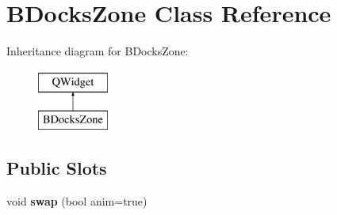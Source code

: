 \hypertarget{class_b_docks_zone}{}\section{B\+Docks\+Zone Class Reference}
\label{class_b_docks_zone}
Inheritance diagram for B\+Docks\+Zone\+:\begin{figure}[H]
\begin{center}
\leavevmode
\includegraphics[height=2.000000cm]{class_b_docks_zone}
\end{center}
\end{figure}
\subsection*{Public Slots}
\begin{DoxyCompactItemize}
\item 
\hypertarget{class_b_docks_zone_a41a7757fb2b8b4cc5c27f9d5a0e3a841}{}\label{class_b_docks_zone_a41a7757fb2b8b4cc5c27f9d5a0e3a841} 
void {\bfseries swap} (bool anim=true)
\end{DoxyCompactItemize}
